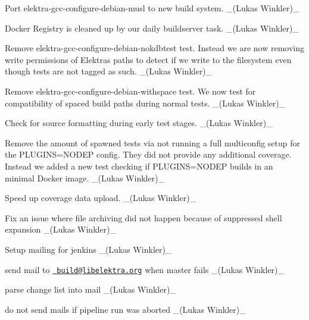 \begin{DoxyItemize}
\item Port {\ttfamily elektra-\/gcc-\/configure-\/debian-\/musl} to new build system. \+\_\+(\+Lukas Winkler)\+\_\+
\item Docker Registry is cleaned up by our daily buildserver task. \+\_\+(\+Lukas Winkler)\+\_\+
\item Remove {\ttfamily elektra-\/gcc-\/configure-\/debian-\/nokdbtest} test. Instead we are now removing write permissions of Elektra\textquotesingle{}s paths to detect if we write to the filesystem even though tests are not tagged as such. \+\_\+(\+Lukas Winkler)\+\_\+
\item Remove {\ttfamily elektra-\/gcc-\/configure-\/debian-\/withspace} test. We now test for compatibility of spaced build paths during normal tests. \+\_\+(\+Lukas Winkler)\+\_\+
\item Check for source formatting during early test stages. \+\_\+(\+Lukas Winkler)\+\_\+
\item Remove the amount of spawned tests via not running a full multiconfig setup for the {\ttfamily P\+L\+U\+G\+I\+NS=N\+O\+D\+EP} config. They did not provide any additional coverage. Instead we added a new test checking if {\ttfamily P\+L\+U\+G\+I\+NS=N\+O\+D\+EP} builds in an minimal Docker image. \+\_\+(\+Lukas Winkler)\+\_\+
\item Speed up coverage data upload. \+\_\+(\+Lukas Winkler)\+\_\+
\item Fix an issue where file archiving did not happen because of suppressed shell expansion \+\_\+(\+Lukas Winkler)\+\_\+
\item Setup mailing for jenkins \+\_\+(\+Lukas Winkler)\+\_\+
\begin{DoxyItemize}
\item send mail to \href{mailto:build@libelektra.org}{\texttt{ build@libelektra.\+org}} when {\ttfamily master} fails \+\_\+(\+Lukas Winkler)\+\_\+
\item parse change list into mail \+\_\+(\+Lukas Winkler)\+\_\+
\item do not send mails if pipeline run was aborted \+\_\+(\+Lukas Winkler)\+\_\+
\end{DoxyItemize}
\end{DoxyItemize}


